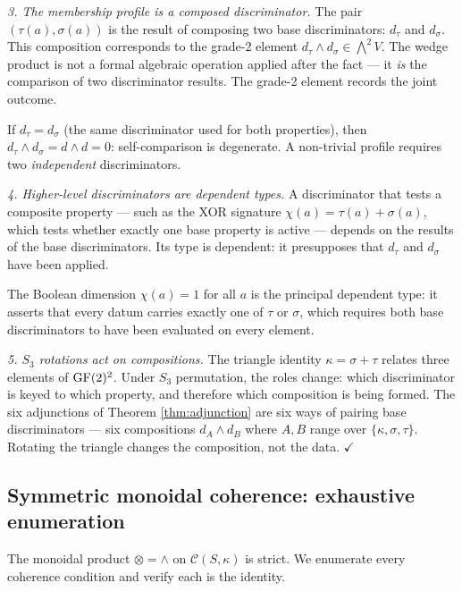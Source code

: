 \emph{3. The membership profile is a composed
discriminator.}
The pair $(\tau(a), \sigma(a))$ is the result of
composing two base discriminators: $d_\tau$ and
$d_\sigma$. This composition corresponds to the
grade-2 element $d_\tau \wedge d_\sigma \in
\bigwedge^2 V$. The wedge product is not a formal
algebraic operation applied after the fact --- it
\emph{is} the comparison of two discriminator results.
The grade-2 element records the joint outcome.

If $d_\tau = d_\sigma$ (the same discriminator used
for both properties), then
$d_\tau \wedge d_\sigma = d \wedge d = 0$: self-comparison
is degenerate. A non-trivial profile requires two
\emph{independent} discriminators.

\emph{4. Higher-level discriminators are dependent types.}
A discriminator that tests a composite property ---
such as the XOR signature $\chi(a) = \tau(a) + \sigma(a)$,
which tests whether exactly one base property is
active --- depends on the results of the base
discriminators. Its type is dependent: it presupposes
that $d_\tau$ and $d_\sigma$ have been applied.

The Boolean dimension $\chi(a) = 1$ for all $a$ is the
principal dependent type: it asserts that every datum
carries exactly one of $\tau$ or $\sigma$, which requires
both base discriminators to have been evaluated on every
element.

\emph{5. $S_3$ rotations act on compositions.}
The triangle identity $\kappa = \sigma + \tau$ relates
three elements of $\operatorname{GF}(2)^2$. Under $S_3$ permutation,
the roles change: which discriminator is keyed to which
property, and therefore which composition is being formed.
The six adjunctions of Theorem \ref{thm:adjunction} are
six ways of pairing base discriminators --- six
compositions $d_A \wedge d_B$ where $A, B$ range over
$\{\kappa, \sigma, \tau\}$. Rotating the triangle changes
the composition, not the data. $\checkmark$


\subsection{Symmetric monoidal coherence: exhaustive
  enumeration}
\label{app:monoidal-coherence}

The monoidal product $\otimes = \wedge$ on
$\mathcal{C}(S,\kappa)$ is strict. We enumerate every
coherence condition and verify each is the identity.

